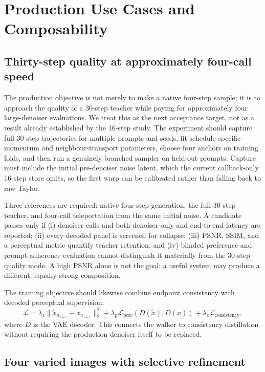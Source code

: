 \documentclass[11pt,a4paper]{article}
\begin{document}
\section{Production Use Cases and Composability}
\label{sec:production-use-cases}

\subsection{Thirty-step quality at approximately four-call speed}

The production objective is not merely to make a native four-step sample; it is
to approach the quality of a 30-step teacher while paying for approximately
four large-denoiser evaluations. We treat this as the next acceptance target,
not as a result already established by the 16-step study. The experiment should
capture full 30-step trajectories for multiple prompts and seeds, fit
schedule-specific momentum and neighbour-transport parameters, choose four
anchors on training folds, and then run a genuinely branched sampler on held-out
prompts. Capture must include the initial pre-denoiser noise latent, which the
current callback-only 16-step store omits, so the first warp can be calibrated
rather than falling back to raw Taylor.

Three references are required: native four-step generation, the full 30-step
teacher, and four-call teleportation from the same initial noise. A candidate
passes only if (i) denoiser calls and both denoiser-only and end-to-end latency
are reported; (ii) every decoded panel is screened for collapse; (iii) PSNR,
SSIM, and a perceptual metric quantify teacher retention; and (iv) blinded
preference and prompt-adherence evaluation cannot distinguish it materially
from the 30-step quality mode. A high PSNR alone is not the goal: a useful
system may produce a different, equally strong composition.

The training objective should likewise combine endpoint consistency with
decoded perceptual supervision:
\begin{equation}
  \mathcal{L} =
  \lambda_z \lVert \tilde{x}_{a_{j+1}}-x_{a_{j+1}}\rVert_2^2
  + \lambda_p \mathcal{L}_{\mathrm{perc}}(D(\tilde{x}),D(x))
  + \lambda_c \mathcal{L}_{\mathrm{consistency}},
\end{equation}
where $D$ is the VAE decoder. This connects the walker to consistency
distillation without requiring the production denoiser itself to be replaced.

\subsection{Four varied images with selective refinement}
\end{document}
